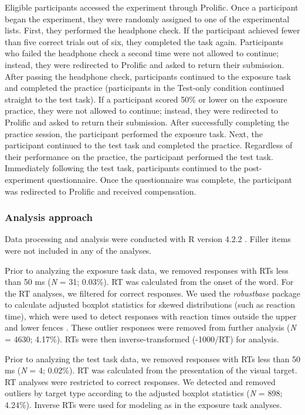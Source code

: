 \documentclass[preprint, 3p, authoryear]{elsarticle} %
\begin{document}
Eligible participants accessed the experiment through Prolific.
Once a participant began the experiment, they were randomly assigned to one of the experimental lists.
First, they performed the headphone check.
If the participant achieved fewer than five correct trials out of six, they completed the task again.
Participants who failed the headphone check a second time were not allowed to continue; instead, they were redirected to Prolific and asked to return their submission.
After passing the headphone check, participants continued to the exposure task and completed the practice (participants in the Test-only condition continued straight to the test task).
If a participant scored 50\% or lower on the exposure practice, they were not allowed to continue; instead, they were redirected to Prolific and asked to return their submission.
After successfully completing the practice session, the participant performed the exposure task.
Next, the participant continued to the test task and completed the practice.
Regardless of their performance on the practice, the participant performed the test task.
Immediately following the test task, participants continued to the post-experiment questionnaire.
Once the questionnaire was complete, the participant was redirected to Prolific and received compensation.

\hypertarget{methods-analysis-1a}{%
\subsubsection{Analysis approach}\label{methods-analysis-1a}}

Data processing and analysis were conducted with R version 4.2.2 \citep{rcore2022}.
Filler items were not included in any of the analyses.

Prior to analyzing the exposure task data, we removed responses with RTs less than 50 ms (\emph{N} = 31; 0.03\%).
RT was calculated from the onset of the word.
For the RT analyses, we filtered for correct responses.
We used the \emph{robustbase} package to calculate adjusted boxplot statistics for skewed distributions (such as reaction time), which were used to detect responses with reaction times outside the upper and lower fences \citep{hubert2008}.
These outlier responses were removed from further analysis (\emph{N} = 4630; 4.17\%).
RTs were then inverse-transformed (-1000/RT) for analysis.

Prior to analyzing the test task data, we removed responses with RTs less than 50 ms (\emph{N} = 4; 0.02\%).
RT was calculated from the presentation of the visual target.
RT analyses were restricted to correct responses.
We detected and removed outliers by target type according to the adjusted boxplot statistics (\emph{N} = 898; 4.24\%).
Inverse RTs were used for modeling as in the exposure task analyses.
\end{document}
